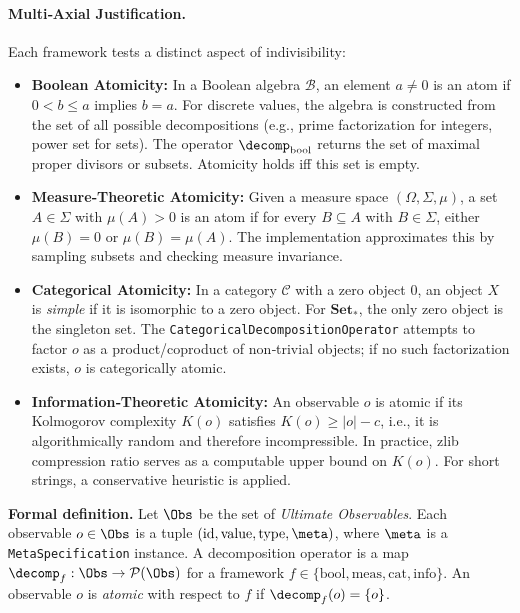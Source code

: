 \paragraph{Multi‑Axial Justification.}
Each framework tests a distinct aspect of indivisibility:
\begin{itemize}
    \item \textbf{Boolean Atomicity:} In a Boolean algebra $\mathcal{B}$, an element $a \neq 0$ is an atom if $0 < b \leq a$ implies $b = a$. For discrete values, the algebra is constructed from the set of all possible decompositions (e.g., prime factorization for integers, power set for sets). The operator $\decomp_{\text{bool}}$ returns the set of maximal proper divisors or subsets. Atomicity holds iff this set is empty.
    \item \textbf{Measure‑Theoretic Atomicity:} Given a measure space $(\Omega, \Sigma, \mu)$, a set $A \in \Sigma$ with $\mu(A) > 0$ is an atom if for every $B \subseteq A$ with $B \in \Sigma$, either $\mu(B)=0$ or $\mu(B)=\mu(A)$. The implementation approximates this by sampling subsets and checking measure invariance.
    \item \textbf{Categorical Atomicity:} In a category $\mathcal{C}$ with a zero object $0$, an object $X$ is \emph{simple} if it is isomorphic to a zero object. For $\mathbf{Set}_*$, the only zero object is the singleton set. The \texttt{CategoricalDecompositionOperator} attempts to factor $o$ as a product/coproduct of non‑trivial objects; if no such factorization exists, $o$ is categorically atomic.
    \item \textbf{Information‑Theoretic Atomicity:} An observable $o$ is atomic if its Kolmogorov complexity $K(o)$ satisfies $K(o) \geq |o| - c$, i.e., it is algorithmically random and therefore incompressible. In practice, zlib compression ratio serves as a computable upper bound on $K(o)$. For short strings, a conservative heuristic is applied.
\end{itemize}

\textbf{Formal definition.} Let $\Obs$ be the set of \textit{Ultimate Observables}. Each observable $o \in \Obs$ is a tuple $(\text{id}, \text{value}, \text{type}, \meta)$, where $\meta$ is a \texttt{MetaSpecification} instance. A decomposition operator is a map $\decomp_f: \Obs \to \mathcal{P}(\Obs)$ for a framework $f \in \{\text{bool}, \text{meas}, \text{cat}, \text{info}\}$. An observable $o$ is \emph{atomic} with respect to $f$ if $\decomp_f(o) = \{o\}$.

